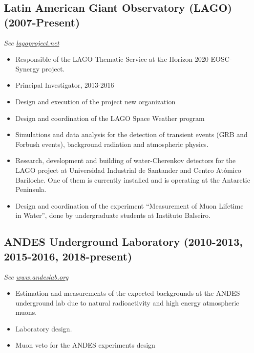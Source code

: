 \subsection*{Latin American Giant Observatory (LAGO) (2007-Present)}
{\small{\textit{See \href{http://lagoproject.net}{lagoproject.net}}}}
\begin{itemize}
\item Responsible of the LAGO Thematic Service at the Horizon 2020 EOSC-Synergy project.
\item Principal Investigator, 2013-2016
\item Design and execution of the project new organization
\item Design and coordination of the LAGO Space Weather program
\item Simulations and data analysis for the detection of transient events
(GRB and Forbush events), background radiation and atmospheric physics.
\item Research, development and building of water-Cherenkov detectors for the
	LAGO project at Universidad Industrial de Santander and Centro Atómico
	Bariloche. One of them is currently installed and is operating at the Antarctic Peninsula.
\item Design and coordination of the experiment ``Measurement of Muon Lifetime in Water'', done by undergraduate students at Instituto Balseiro.
\end{itemize}

\subsection*{ANDES Underground Laboratory (2010-2013, 2015-2016, 2018-present)}
{\small{\textit{See \href{http://www.andeslab.org}{www.andeslab.org}}}}
\begin{itemize}
\item Estimation and measurements of the expected backgrounds at the ANDES
underground lab due to natural radioactivity and high energy atmospheric muons.
\item Laboratory design.
\item Muon veto for the ANDES experiments design
\end{itemize}

\ifres
\else
